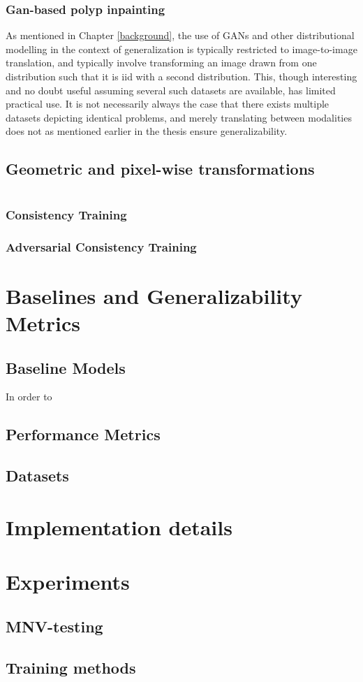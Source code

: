 \subsubsection{Gan-based polyp inpainting}
As mentioned in Chapter \ref{background}, the use of GANs and other distributional modelling in the context of generalization is typically restricted to image-to-image translation, and typically involve transforming an image drawn from one distribution such that it is iid with a second distribution. This, though interesting and no doubt useful assuming several such datasets are available, has limited practical use. It is not necessarily always the case that there exists multiple datasets depicting identical problems, and merely translating between modalities does not as mentioned earlier in the thesis ensure generalizability.




\subsection{Geometric and pixel-wise transformations}
\section{\alg}
    \subsubsection{Consistency Training}
    \subsubsection{Adversarial Consistency Training}
    \subsubsection{}
\section{Baselines and Generalizability Metrics}
    \subsection{Baseline Models}
        In order to 
    \subsection{Performance Metrics}
    \subsection{Datasets}
\section{Implementation details}
\section{Experiments}
    \subsection{MNV-testing}
    \subsection{Training methods}
